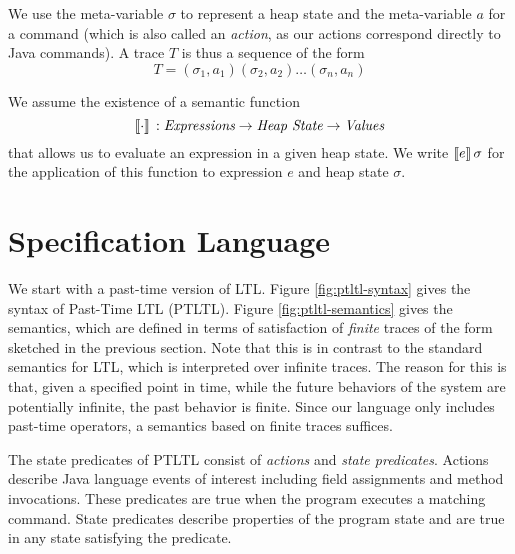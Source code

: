\documentclass{article}
\begin{document}
We use the meta-variable $\sigma$ to represent a heap state and the meta-variable $a$ for a command (which is also called an \emph{action}, as our actions correspond directly to Java commands).  A trace $T$ is thus a sequence of the form
\[T = (\sigma_1,a_1) (\sigma_2,a_2) \ldots (\sigma_n,a_n) \]

We assume the existence of a semantic function
\[\llbracket\cdot\rrbracket\, : \textit{Expressions} \rightarrow \textit{Heap State} \rightarrow \textit{Values}\]
that allows us to evaluate an expression in a given heap state.  We write $\llbracket e\rrbracket\, \sigma$ for the application of this function to expression $e$ and heap state $\sigma$.

\section{Specification Language}

We start with a past-time version of LTL.  Figure \ref{fig:ptltl-syntax} gives the syntax of Past-Time LTL (PTLTL).  Figure \ref{fig:ptltl-semantics} gives the semantics, which are defined in terms of satisfaction of \emph{finite} traces of the form sketched in the previous section.  Note that this is in contrast to the standard semantics for LTL, which is interpreted over infinite traces.  The reason for this is that, given a specified point in time, while the future behaviors of the system are potentially infinite, the past behavior is finite.  Since our language only includes past-time operators, a semantics based on finite traces suffices.

The state predicates of PTLTL consist of \emph{actions} and \emph{state predicates}.  Actions describe Java language events of interest including field assignments and method invocations.  These predicates are true when the program executes a matching command.  State predicates describe properties of the program state and are true in any state satisfying the predicate.

\vspace*{1em}
\noindent
{}
\vspace*{1em}
\end{document}
